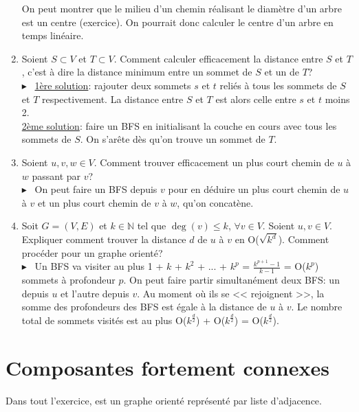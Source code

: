 \documentclass[mp2i]{exam}
\begin{document}
\begin{enumerate}
\begin{center}
		\end{center}
		On peut montrer que le milieu d'un chemin réalisant le diamètre d'un arbre est un centre (exercice). On pourrait donc calculer le centre d'un arbre en temps linéaire. 
		\fi 
		\item Soient $S \subset V$ et $T \subset V$. Comment calculer efficacement la distance entre $S$ et $T$, c'est à dire la distance minimum entre un sommet de $S$ et un de $T$?
		\if{}
		\\$\blacktriangleright$~ \underline{1ère solution}: rajouter deux sommets $s$ et $t$ reliés à tous les sommets de $S$ et $T$ respectivement. La distance entre $S$ et $T$ est alors celle entre $s$ et $t$ moins 2.\\
		\underline{2ème solution}: faire un BFS en initialisant la couche  en cours avec tous les sommets de $S$. On s'arête dès qu'on trouve un sommet de $T$. 
		\fi 
		\item Soient $u, v, w \in V$. Comment trouver efficacement un plus court chemin de $u$ à $w$ passant par $v$?
		\if{}
		\\$\blacktriangleright$~ On peut faire un BFS depuis $v$ pour en déduire un plus court chemin de $u$ à $v$ et un plus court chemin de $v$ à $w$, qu'on concatène.
		\fi 
		\item Soit $G = (V, E)$ et $k \in \mathbb{N}$ tel que $\deg(v) \leq k$, $\forall v \in V$. Soient $u, v \in V$. Expliquer comment trouver la distance $d$ de $u$ à $v$ en O($\sqrt{k^{d}}$). Comment procéder pour un graphe orienté?
		\if{}
		\\$\blacktriangleright$~ Un BFS va visiter au plus 1 + $k$ + $k^2$ + ... + $k^p$ = $\frac{k^{p+1} - 1}{k - 1}$ = O($k^p$) sommets à profondeur $p$. On peut faire partir simultanément deux BFS: un depuis $u$ et l'autre depuis $v$. Au moment où ils se << rejoignent >>, la somme des profondeurs des BFS est égale à la distance de $u$ à $v$. Le nombre total de sommets visités est au plus O($k^{\frac{d}{2}}$) + O($k^{\frac{d}{2}}$) = O($k^{\frac{d}{2}}$).
		\fi 
	\end{enumerate}
	\if{} \newpage \fi
	
	\section{Composantes fortement connexes}
	Dans tout l'exercice,  est un graphe orienté représenté par liste d'adjacence.
\end{document}
